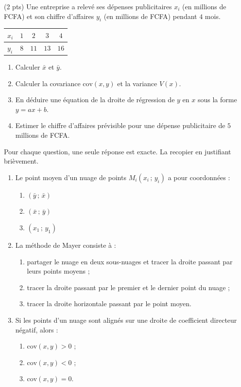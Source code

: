 \documentclass[11pt]{article}
\begin{document}
\begin{exercice} (2 pts)
Une entreprise a relevé ses dépenses publicitaires $x_i$ (en millions de FCFA) et son chiffre d'affaires $y_i$ (en millions de FCFA) pendant $4$ mois.

\begin{center}
\begin{tabular}{|l|c|c|c|c|}
\hline
$x_i$ & $1$ & $2$ & $3$ & $4$ \\
\hline
$y_i$ & $8$ & $11$ & $13$ & $16$ \\
\hline
\end{tabular}
\end{center}

\begin{enumerate}
\item Calculer $\bar{x}$ et $\bar{y}$.
\item Calculer la covariance $\mathrm{cov}(x,y)$ et la variance $V(x)$.
\item En déduire une équation de la droite de régression de $y$ en $x$ sous la forme $y = ax + b$.
\item Estimer le chiffre d'affaires prévisible pour une dépense publicitaire de $5$ millions de FCFA.
\end{enumerate}
\end{exercice}

\begin{exercice}[QCM]
Pour chaque question, une seule réponse est exacte. La recopier en justifiant brièvement.
\begin{enumerate}
\item Le point moyen d'un nuage de points $M_i(x_i\,;\,y_i)$ a pour coordonnées :
\begin{enumerate}
\item $(\bar{y}\,;\,\bar{x})$
\item $(\bar{x}\,;\,\bar{y})$
\item $(x_1\,;\,y_1)$
\end{enumerate}
\item La méthode de Mayer consiste à :
\begin{enumerate}
\item partager le nuage en deux sous-nuages et tracer la droite passant par leurs points moyens ;
\item tracer la droite passant par le premier et le dernier point du nuage ;
\item tracer la droite horizontale passant par le point moyen.
\end{enumerate}
\item Si les points d'un nuage sont alignés sur une droite de coefficient directeur négatif, alors :
\begin{enumerate}
\item $\mathrm{cov}(x,y) > 0$ ;
\item $\mathrm{cov}(x,y) < 0$ ;
\item $\mathrm{cov}(x,y) = 0$.
\end{enumerate}
\end{enumerate}
\end{exercice}
\end{document}
